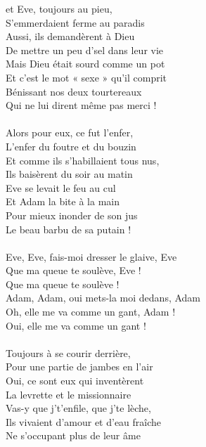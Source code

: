 
 et Eve, toujours au pieu, 
\\S'emmerdaient ferme au paradis
\\Aussi, ils demandèrent à Dieu 
\\De mettre un peu d'sel dans leur vie
\\Mais Dieu était sourd comme un pot 
\\Et c'est le mot « sexe » qu'il comprit
\\Bénissant nos deux tourtereaux 
\\Qui ne lui dirent même pas merci !
\\\\Alors pour eux, ce fut l'enfer, 
\\L'enfer du foutre et du bouzin
\\Et comme ils s'habillaient tous nus, 
\\Ils baisèrent du soir au matin
\\Eve se levait le feu au cul 
\\Et Adam la bite à la main
\\Pour mieux inonder de son jus
\\Le beau barbu de sa putain !
\\\\Eve, Eve, fais-moi dresser le glaive, Eve
\\Que ma queue te soulève, Eve !
\\Que ma queue te soulève !
\\Adam, Adam, oui mets-la moi dedans, Adam
\\Oh, elle me va comme un gant, Adam !
\\Oui, elle me va comme un gant !
\\\\Toujours à se courir derrière, 
\\Pour une partie de jambes en l'air
\\Oui, ce sont eux qui inventèrent
\\La levrette et le missionnaire
\\Vas-y que j't'enfile, que j'te lèche, 
\\Ils vivaient d'amour et d'eau fraîche
\\Ne s'occupant plus de leur âme 
